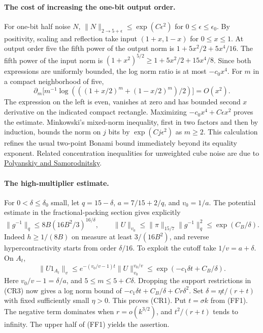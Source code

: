 \paragraph{The cost of increasing the one-bit output order.}
For one-bit half noise $N$, $\|N\|_{2\to5+\epsilon}\le
\exp(C\epsilon^2)$ for $0\le\epsilon\le\epsilon_0$. By positivity, scaling and reflection take input $(1+x,1-x)$ for $0\le x\le1$. At output order five the fifth power of the output norm is $1+5x^2/2+5x^4/16$. The fifth power of the input norm is $(1+x^2)^{5/2}\ge1+5x^2/2+15x^4/8$. Since both expressions are uniformly bounded, the log norm ratio is at most $-c_0 x^4$. For $m$ in a compact neighborhood of five,
\[
 \partial_m\big[m^{-1}\log(((1+x/2)^m+(1-x/2)^m)/2)\big]=O(x^2).
\]
The expression on the left is even, vanishes at zero and has bounded second $x$ derivative on the indicated compact rectangle. Maximizing $-c_0x^4+C\epsilon x^2$ proves the estimate. Minkowski's mixed-norm inequality, first in two factors and then by induction, bounds the norm on $j$ bits by $\exp(Cj\epsilon^2)$ as $m\ge2$. This calculation refines the usual two-point Bonami bound immediately beyond its equality exponent. Related concentration inequalities for unweighted cube noise are due to \href{https://arxiv.org/abs/1606.07491}{Polyanskiy and Samorodnitsky}.

\paragraph{The high-multiplier estimate.}
For $0<\delta\le\delta_0$ small, let $q=15-\delta$, $a=7/15+2/q$, and $v_0=1/a$. The potential estimate in the fractional-packing section gives explicitly
\[
 \|g^{-1}\|_q\le 8B(16B^2/3)^{16/\delta},
 \qquad \|U\|_{v_0}\le \|\pi\|_{15/7}\|g^{-1}\|_q^2
                         \le \exp(C_B/\delta).
\]
Indeed $h\ge1/(8B)$ on measure at least $3/(16B^2)$, and reverse hypercontractivity starts from order $\delta/16$. To exploit the cutoff take $1/v=a+\delta$. On $A_t$,
\[
 \|U1_{A_t}\|_v\le e^{-(v_0/v-1)t}\|U\|_{v_0}^{v_0/v}
               \le \exp(-c_1\delta t+C_B/\delta).
\]
Here $v_0/v-1=\delta/a$, and $5\le m\le 5+C\delta$. Dropping the support restrictions in (CR3) now gives a log norm bound of $-c_1\delta t+C_B/\delta+Cr\delta^2$. Set $\delta=\eta t/(r+t)$ with fixed sufficiently small $\eta>0$. This proves (CR1). Put $t=\sigma k$ from (FF1). The negative term dominates when $r=o(k^{3/2})$, and $t^2/(r+t)$ tends to infinity. The upper half of (FF1) yields the assertion.

